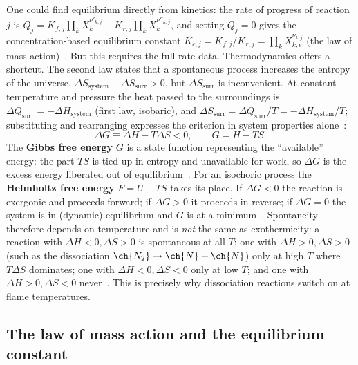 One could find equilibrium directly from kinetics: the rate of progress of reaction $j$ is $Q_j=K_{f,j}\prod_k X_k^{\nu'_{k,j}}-K_{r,j}\prod_k X_k^{\nu''_{k,j}}$, and setting $Q_j=0$ gives the concentration-based equilibrium constant $K_{c,j}=K_{f,j}/K_{r,j}=\prod_k X_{k,e}^{\nu_{k,j}}$ (the law of mass action)~\cite{lecture2}. But this requires the full rate data. Thermodynamics offers a shortcut. The second law states that a spontaneous process increases the entropy of the universe, $\Delta S_{\mathrm{system}}+\Delta S_{\mathrm{surr}}>0$, but $\Delta S_{\mathrm{surr}}$ is inconvenient. At constant temperature and pressure the heat passed to the surroundings is $\Delta Q_{\mathrm{surr}}=-\Delta H_{\mathrm{system}}$ (first law, isobaric), and $\Delta S_{\mathrm{surr}}=\Delta Q_{\mathrm{surr}}/T=-\Delta H_{\mathrm{system}}/T$; substituting and rearranging expresses the criterion in system properties alone~\cite{lecture2}:
\begin{equation}
\Delta G\equiv\Delta H-T\Delta S<0,\qquad G=H-TS .
\label{eq:gibbs}
\end{equation}
The \textbf{Gibbs free energy} $G$ is a state function representing the ``available'' energy: the part $TS$ is tied up in entropy and unavailable for work, so $\Delta G$ is the excess energy liberated out of equilibrium~\cite{lecture2}. For an isochoric process the \textbf{Helmholtz free energy} $F=U-TS$ takes its place. If $\Delta G<0$ the reaction is exergonic and proceeds forward; if $\Delta G>0$ it proceeds in reverse; if $\Delta G=0$ the system is in (dynamic) equilibrium and $G$ is at a minimum~\cite{lecture2,transcript_tutorial}. Spontaneity therefore depends on temperature and is \emph{not} the same as exothermicity: a reaction with $\Delta H<0,\Delta S>0$ is spontaneous at all $T$; one with $\Delta H>0,\Delta S>0$ (such as the dissociation $\ch{N_2}\rightarrow\ch{N}+\ch{N}$) only at high $T$ where $T\Delta S$ dominates; one with $\Delta H<0,\Delta S<0$ only at low $T$; and one with $\Delta H>0,\Delta S<0$ never~\cite{lecture2}. This is precisely why dissociation reactions switch on at flame temperatures.

\subsection{The law of mass action and the equilibrium constant}

